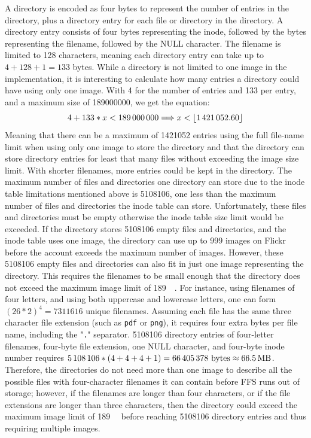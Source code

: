 A directory is encoded as four bytes to represent the number of entries in the directory, plus a directory entry for each file or directory in the directory. A directory entry consists of four bytes representing the inode, followed by the bytes representing the filename, followed by the NULL character. The filename is limited to 128 characters, meaning each directory entry can take up to $4 + 128 + 1 = 133$ bytes. While a directory is not limited to one image in the implementation, it is interesting to calculate how many entries a directory could have using only one image. With \SI{4}{\byte} for the number of entries and \SI{133}{\byte} per entry, and a maximum size of \SI{189000000}{\byte}, we get the equation:
\begin{equation}
	4 + 133 * x < \num{189000000} \Longrightarrow x < \lfloor \num{1421052.60} \rfloor
\end{equation}
Meaning that there can be a maximum of \num{1421052} entries using the full file-name limit when using only one image to store the directory and that the directory can store directory entries for least that many files without exceeding the image size limit. With shorter filenames, more entries could be kept in the directory. The maximum number of files and directories one directory can store due to the inode table limitations mentioned above is \num{5108106}, one less than the maximum number of files and directories the inode table can store. Unfortunately, these files and directories must be empty otherwise the inode table size limit would be exceeded. If the directory stores \num{5108106} empty files and directories, and the inode table uses one image, the directory can use up to \num{999} images on Flickr before the account exceeds the maximum number of images. However, these \num{5108106} empty files and directories can also fit in just one image representing the directory. This requires the filenames to be small enough that the directory does not exceed the maximum image limit of \SI{189}{\mega\byte}. For instance, using filenames of four letters, and using both uppercase and lowercase letters, one can form $(26*2)^4 = \num{7311616}$ unique filenames. Assuming each file has the same three character file extension (such as \texttt{pdf} or \texttt{png}), it requires four extra bytes per file name, including the "\texttt{.}" separator. \num{5108106} directory entries of \mbox{four-letter} filenames, \mbox{four-byte} file extension, one NULL character, and \mbox{four-byte} inode number requires $\num{5108106} * (4 + 4 + 4 + 1) = \num{66405378}\text{ bytes} \approx \text{\SI{66.5}{\mega\byte}}$. Therefore, the directories do not need more than one image to describe all the possible files with four-character filenames it can contain before \gls{FFS} runs out of storage; however, if the filenames are longer than four characters, or if the file extensions are longer than three characters, then the directory could exceed the maximum image limit of \SI{189}{\mega\byte} before reaching \num{5108106} directory entries and thus requiring multiple images.

